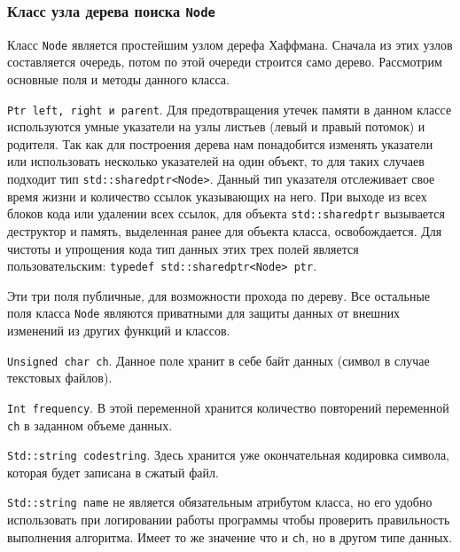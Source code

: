 \subsubsection{Класс узла дерева поиска \texttt{Node}}


Класс \texttt{Node} является простейшим узлом дерефа Хаффмана.
Сначала из этих узлов составляется очередь, потом по этой очереди строится само дерево.
Рассмотрим основные поля и методы данного класса.



\texttt{Ptr left, right и parent}.
Для предотвращения утечек памяти в данном классе используются умные указатели на узлы листьев (левый и правый потомок) и родителя.
Так как для построения дерева нам понадобится изменять указатели или использовать несколько указателей на один объект, то для таких случаев подходит тип \texttt{std::shared{\textunderscore}ptr<Node>}.
Данный тип указателя отслеживает свое время жизни и количество ссылок указывающих на него.
При выходе из всех блоков кода или удалении всех ссылок, для объекта \texttt{std::shared{\textunderscore}ptr} вызывается деструктор и память, выделенная ранее для объекта класса, освобождается.
Для чистоты и упрощения кода тип данных этих трех полей является пользовательским: \texttt{typedef std::shared{\textunderscore}ptr<Node> ptr}.



Эти три поля публичные, для возможности прохода по дереву.
Все остальные поля класса \texttt{Node} являются приватными для защиты данных от внешних изменений из других функций и классов.



\texttt{Unsigned char ch}. 
Данное поле хранит в себе байт данных (символ в случае текстовых файлов).



\texttt{Int frequency}.
В этой переменной хранится количество повторений переменной \texttt{ch} в заданном объеме данных.



\texttt{Std::string code{\textunderscore}string}. 
Здесь хранится уже окончательная кодировка символа, которая будет записана в сжатый файл.



\texttt{Std::string name} не является обязательным атрибутом класса, но его удобно использовать при логировании работы программы чтобы проверить правильность выполнения алгоритма.
Имеет то же значение что и \texttt{ch}, но в другом типе данных.




